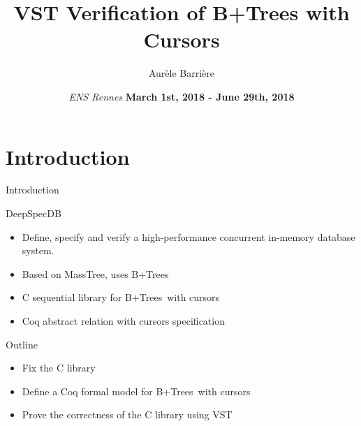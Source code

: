 \documentclass[page number,usenames,dvipsnames]{beamer}
\def\outline{
  \begin{frame}[plain,noframenumbering]
    \frametitle{Outline}
    \tableofcontents[currentsection]
  \end{frame}
}
\def\btrees{B+Trees}
\begin{document}
\title[shorttitle]{VST Verification of B+Trees with Cursors}

\author[Aur\`ele Barri\`ere]{Aur\`ele Barri\`ere}

\date{\textit{ENS Rennes}
  \vfill
  \textbf{March 1st, 2018 - June 29th, 2018}}

\def\outline{
  \begin{frame}[plain,noframenumbering]
    \frametitle{Outline}
    \tableofcontents[currentsection]
  \end{frame}
}



\begin{frame}
  \vspace{-2cm}
  \maketitle
  \vspace{-4cm}
\end{frame}



\section{Introduction}
\begin{frame}{Introduction}
  \begin{block}{DeepSpecDB}
    \begin{itemize}
    \item Define, specify and verify a high-performance {\color{mDarkRed}concurrent} in-memory database system.
    \item Based on MassTree, uses \btrees
    \item C sequential library for \btrees\ with cursors
    \item Coq abstract relation with cursors specification
    \end{itemize}
  \end{block}
  \vfill
  \begin{exampleblock}{Outline}
    \begin{itemize}
    \item Fix the C library
    \item Define a Coq formal model for \btrees\ with cursors
    \item Prove the correctness of the C library using VST
    \end{itemize}
  \end{exampleblock}
      
\end{frame}
\end{document}
